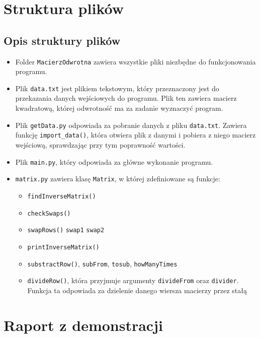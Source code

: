 \documentclass[12pt]{article}
\begin{document}
\section{Struktura plików}
\subsection{Opis struktury plików}
\begin{itemize}
    \item Folder \verb|MacierzOdwrotna| zawiera wszystkie pliki niezbędne do funkcjonowania programu.
    \item Plik \verb|data.txt| jest plikiem tekstowym, który przeznaczony jest do przekazania danych wejściowych do programu. Plik ten zawiera macierz kwadratową, której odwrotność ma za zadanie wyznaczyć program.
    \item Plik \verb|getData.py| odpowiada za pobranie danych z pliku \verb|data.txt|. Zawiera funkcję \verb|import_data()|, która otwiera plik z danymi i pobiera z niego macierz wejściową, sprawdzając przy tym poprawność wartości.
    \item Plik \verb|main.py|, który odpowiada za główne wykonanie programu.
    \item \verb|matrix.py| zawiera klasę \verb|Matrix|, w której zdefiniowane są funkcje: \begin{itemize}
        \item \verb|findInverseMatrix()|
        \item \verb|checkSwaps()|
        \item \verb|swapRows()| \verb|swap1| \verb|swap2|
        \item \verb|printInverseMatrix()|
        \item \verb|substractRow()|, \verb|subFrom|, \verb|tosub|, \verb|howManyTimes|
        \item \verb|divideRow()|, która przyjmuje argumenty \verb|divideFrom| oraz \verb|divider|. Funkcja ta odpowiada za dzielenie danego wiersza macierzy przez stałą
    \end{itemize}
\end{itemize}

\section{Raport z demonstracji}
\end{document}
